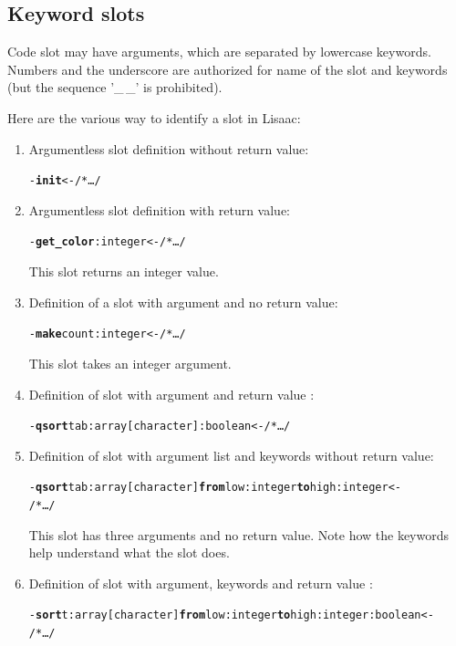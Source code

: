 \documentclass[11pt]{mybook}
\begin{document}
\subsection{Keyword slots}
\label{language_reference:slot_descriptors:keyword_slots}
%
Code slot may have arguments, which are separated by lowercase keywords.
Numbers and the underscore are authorized for name of the slot and keywords (but the sequence '\_\,\_' is prohibited).

Here are the various way to identify a slot in Lisaac:

\begin{enumerate}

\item{Argumentless slot definition without return value:
  \begin{alltt} 
  - {\bf{}init} <- /* \ldots */
  \end{alltt}
}

\item{Argumentless slot definition with return value:
  \begin{alltt} 
  - {\bf{}get\_color}:{\sc{}integer} <- /* \ldots */
  \end{alltt}
  This slot returns an integer value.
}

\item{Definition of a slot with argument and no return value:
  \begin{alltt} 
  - {\bf{}make} count:{\sc{}integer} <- /* \ldots */
  \end{alltt}
  This slot takes an integer argument.
}

\item{Definition of slot with argument and return value :
 \begin{alltt} 
  - {\bf{}qsort} tab:{\sc{}array}[{\sc{}character}] :{\sc{}boolean} <- /* \ldots */
 \end{alltt}
}

\item{Definition of slot with argument list and keywords without return value:
 \begin{alltt}
  - {\bf{}qsort} tab:{\sc{}array}[{\sc{}character}] {\bf{}from} low:{\sc{}integer} {\bf{}to} high:{\sc{}integer} <- 
  /* \ldots */
 \end{alltt}
  This slot has three arguments and no return value. 
  Note how the keywords help understand what the slot does.
}

\item{Definition of slot with argument, keywords and return value :
 \begin{alltt} 
  - {\bf{}sort} t:{\sc{}array}[{\sc{}character}] {\bf{}from} low:{\sc{}integer} {\bf{}to} high:{\sc{}integer} :{\sc{}boolean} <- 
  /* \ldots */
 \end{alltt}
}
\end{enumerate}
\end{document}
